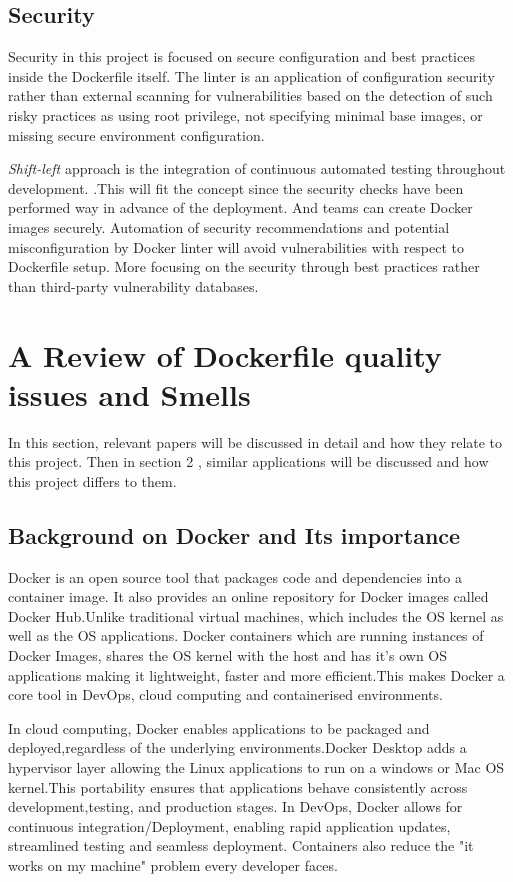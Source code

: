 \subsection{Security}
 Security in this project is focused on secure configuration and best practices inside the Dockerfile itself. The linter is an application of configuration security rather than external scanning for vulnerabilities based on the detection of such risky practices as using root privilege, not specifying minimal base images, or missing secure environment configuration.
    
\textit{Shift-left} approach is the integration of continuous automated testing throughout development.
\cite{shift-left}.This will fit the concept since the security checks have been performed way in advance of the deployment. And teams can create Docker images securely. Automation of security recommendations and potential misconfiguration by Docker linter will avoid vulnerabilities with respect to Dockerfile setup. More focusing on the security through best practices rather than third-party vulnerability databases.




\section{A Review of Dockerfile quality issues and Smells}
In this section, relevant papers will be discussed in detail and how they relate to this project. Then in section 2 , similar applications will be discussed and how this project differs to them.
\subsection{Background on Docker and Its importance}
Docker is an open source tool that packages code and dependencies into a container image. It also provides an online repository for Docker images called Docker Hub.\cite{hardikar2021containerization}Unlike traditional virtual machines, which includes the OS kernel as well as the OS applications. Docker containers which are running instances of Docker Images, shares the OS kernel with the host and has it's own OS applications making it lightweight, faster and more efficient.This makes Docker a core tool in DevOps, cloud computing and containerised environments. \cite{2017Docker}

In cloud computing, Docker enables applications to be packaged and deployed,regardless of the underlying environments.Docker Desktop adds a hypervisor layer allowing the Linux applications to run on a windows or Mac OS kernel.This portability ensures that applications behave consistently across development,testing, and production stages.
In DevOps, Docker allows for continuous integration/Deployment, enabling rapid application updates, streamlined testing and seamless deployment. Containers also reduce the "it works on my machine" problem every developer faces. 


